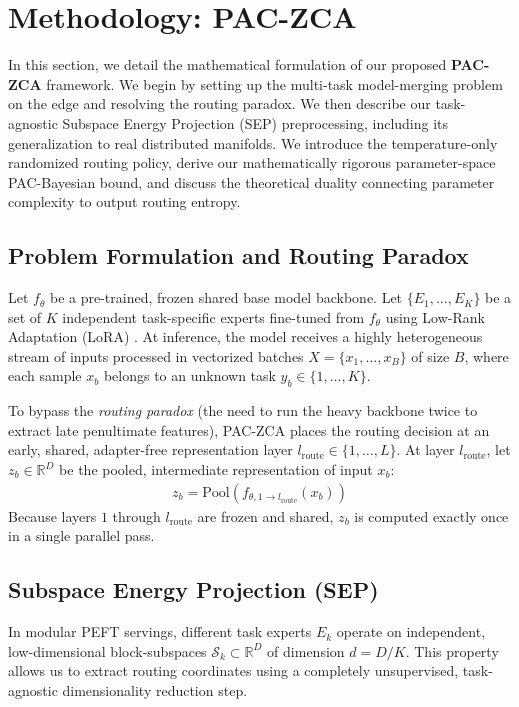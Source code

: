 \section{Methodology: PAC-ZCA}
\label{sec:method}

In this section, we detail the mathematical formulation of our proposed \textbf{PAC-ZCA} framework. We begin by setting up the multi-task model-merging problem on the edge and resolving the routing paradox. We then describe our task-agnostic Subspace Energy Projection (SEP) preprocessing, including its generalization to real distributed manifolds. We introduce the temperature-only randomized routing policy, derive our mathematically rigorous parameter-space PAC-Bayesian bound, and discuss the theoretical duality connecting parameter complexity to output routing entropy.

\subsection{Problem Formulation and Routing Paradox}
Let $f_\theta$ be a pre-trained, frozen shared base model backbone. Let $\{E_1, \dots, E_K\}$ be a set of $K$ independent task-specific experts fine-tuned from $f_\theta$ using Low-Rank Adaptation (LoRA) \cite{hu2021lora}. At inference, the model receives a highly heterogeneous stream of inputs processed in vectorized batches $X = \{x_1, \dots, x_B\}$ of size $B$, where each sample $x_b$ belongs to an unknown task $y_b \in \{1, \dots, K\}$.

To bypass the \textit{routing paradox} (the need to run the heavy backbone twice to extract late penultimate features), PAC-ZCA places the routing decision at an early, shared, adapter-free representation layer $l_{\text{route}} \in \{1, \dots, L\}$. At layer $l_{\text{route}}$, let $z_b \in \mathbb{R}^D$ be the pooled, intermediate representation of input $x_b$:
\begin{align}
    z_b = \text{Pool}\left( f_{\theta, 1 \to l_{\text{route}}}(x_b) \right)
\end{align}
Because layers $1$ through $l_{\text{route}}$ are frozen and shared, $z_b$ is computed exactly once in a single parallel pass.

\subsection{Subspace Energy Projection (SEP)}
In modular PEFT servings, different task experts $E_k$ operate on independent, low-dimensional block-subspaces $\mathcal{S}_k \subset \mathbb{R}^D$ of dimension $d = D/K$. This property allows us to extract routing coordinates using a completely unsupervised, task-agnostic dimensionality reduction step.

